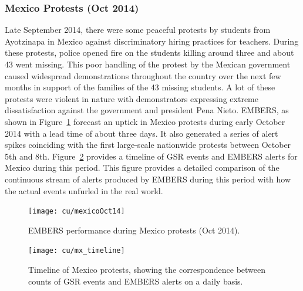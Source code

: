 \subsubsection*{Mexico Protests (Oct 2014)}
\label{sec:mexico}
Late September 2014, there were some peaceful protests by students from Ayotzinapa
in Mexico against discriminatory hiring practices for teachers. During
these protests,
police opened fire on the students killing around three and about 43 went missing. This poor
handling of the protest by the Mexican government caused widespread demonstrations throughout
the country over the next few months in support of the families of the 43 missing students.
A lot of these protests were violent in nature with demonstrators expressing extreme
dissatisfaction against the government and president Pena Nieto. EMBERS, as
shown in Figure~\ref{fig:mexicoOct14}
forecast an uptick in Mexico protests during early October 2014 with a lead time of about three days.
It also generated  a series of alert spikes coinciding with the first
large-scale nationwide protests between October 5th and 8th.
Figure~\ref{fig:mexicoTimeline} provides a timeline of GSR events and
EMBERS alerts for Mexico during this period. This figure provides a detailed
comparison of the continuous stream of alerts produced by EMBERS during this period with how
the actual events unfurled in the real world.

\begin{figure} %
\centering
\texttt{[image: cu/mexicoOct14]}
\caption{EMBERS performance during Mexico protests (Oct 2014).}
\label{fig:mexicoOct14}
\end{figure}

\begin{figure}
\centering
\texttt{[image: cu/mx\_timeline]}
\caption{Timeline of Mexico protests, showing the correspondence
between counts of GSR events and EMBERS alerts on a daily basis.}
\label{fig:mexicoTimeline}
\end{figure}

